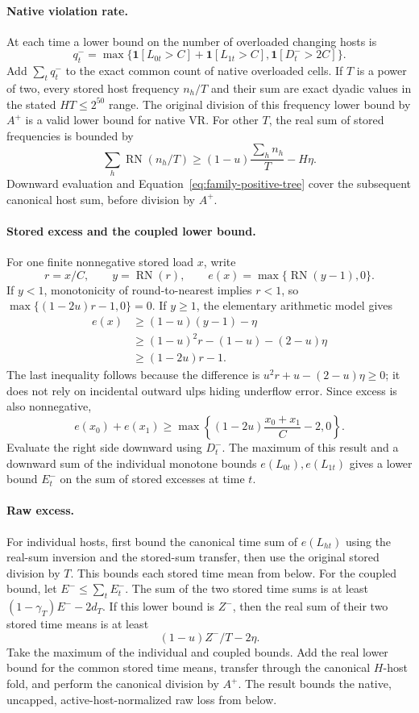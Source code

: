 \documentclass[11pt]{article}
\begin{document}
\paragraph{Native violation rate.}
At each time a lower bound on the number of overloaded changing hosts is
\[
 q^-_t=\max\{\mathbf 1[L_{0t}>C]+\mathbf 1[L_{1t}>C],
                     \mathbf 1[D^-_t>2C]\}.
\]
Add $\sum_tq^-_t$ to the exact common count of native overloaded cells. If $T$ is a power of two, every stored host frequency $n_h/T$ and their sum are exact dyadic values in the stated $HT\le2^{50}$ range.  The original division of this frequency lower bound by $A^+$ is a valid lower bound for native VR.  For other $T$, the real sum of stored frequencies is bounded by
\[
 \sum_h\operatorname{RN}(n_h/T)
 \ge (1-u)\frac{\sum_hn_h}{T}-H\eta.
\]
Downward evaluation and Equation~\eqref{eq:family-positive-tree} cover the subsequent canonical host sum, before division by $A^+$.

\paragraph{Stored excess and the coupled lower bound.}
For one finite nonnegative stored load $x$, write
\[
 r=x/C,\qquad y=\operatorname{RN}(r),\qquad
 e(x)=\max\{\operatorname{RN}(y-1),0\}.
\]
If $y<1$, monotonicity of round-to-nearest implies $r<1$, so $\max\{(1-2u)r-1,0\}=0$.  If $y\ge1$, the elementary arithmetic model gives
\begin{align*}
 e(x)&\ge(1-u)(y-1)-\eta\\
     &\ge(1-u)^2r-(1-u)-(2-u)\eta\\
     &\ge(1-2u)r-1.
\end{align*}
The last inequality follows because the difference is $u^2r+u-(2-u)\eta\ge0$; it does not rely on incidental outward ulps hiding underflow error.  Since excess is also nonnegative,
\begin{equation}
 e(x_0)+e(x_1)\ge
 \max\left\{(1-2u)\frac{x_0+x_1}{C}-2,0\right\}.
 \label{eq:family-coupled-excess}
\end{equation}
Evaluate the right side downward using $D^-_t$.  The maximum of this result and a downward sum of the individual monotone bounds $e(L_{0t}),e(L_{1t})$ gives a lower bound $E^-_t$ on the sum of stored excesses at time $t$.

\paragraph{Raw excess.}
For individual hosts, first bound the canonical time sum of $e(L_{ht})$ using the real-sum inversion and the stored-sum transfer, then use the original stored division by $T$.  This bounds each stored time mean from below. For the coupled bound, let $E^-\le\sum_tE^-_t$.  The sum of the two stored time sums is at least $(1-\gamma_T)E^--2d_T$.  If this lower bound is $Z^-$, then the real sum of their two stored time means is at least
\[
 (1-u) Z^-/T-2\eta.
\]
Take the maximum of the individual and coupled bounds.  Add the real lower bound for the common stored time means, transfer through the canonical $H$-host fold, and perform the canonical division by $A^+$.  The result bounds the native, uncapped, active-host-normalized raw loss from below.
\end{document}
